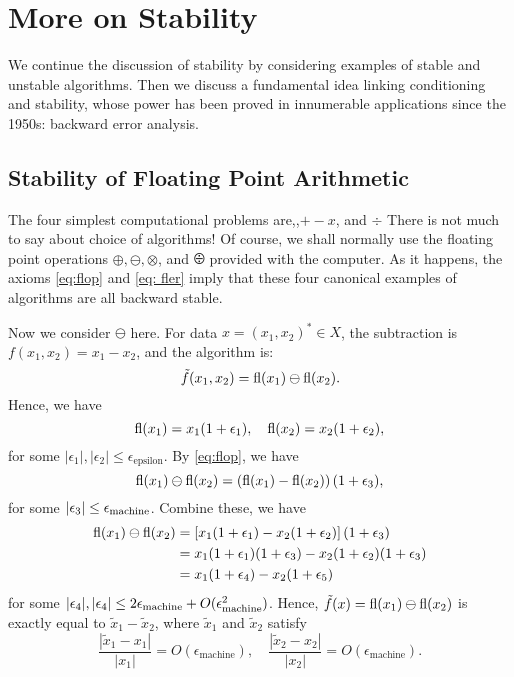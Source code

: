 \chapter{More on Stability}
We continue the discussion of stability by considering examples of stable and unstable algorithms. Then we discuss a fundamental idea linking conditioning and stability, whose power has been proved in innumerable applications since the 1950s: backward error analysis.

\section{Stability of Floating Point Arithmetic}
The four simplest computational problems are,,$+- x$, and $\div$ There is not much to say about choice of algorithms! Of course, we shall normally use the floating point operations $\oplus, \ominus, \otimes$, and $\odiv$ provided with the computer. As it happens, the axioms \eqref{eq:flop} and \eqref{eq: fler} imply that these four canonical examples of algorithms are all backward stable.

Now we consider $\ominus$ here. For data $x=(x_1,x_2)^* \in X$, the subtraction is $f(x_1, x_2) = x_1 - x_2$, and the algorithm is: 
\[
    \tilde f(x_1, x_2) = \operatorname{fl}(x_1) \ominus \operatorname{fl}(x_2). 
\]
Hence, we have 
\[
    \operatorname{fl}(x_1) = x_1(1+\epsilon _1) , \quad \operatorname{fl}(x_2) = x_2 (1+\epsilon _2),
\]
for some $|\epsilon _1| , |\epsilon _2| \le \epsilon_{\text{epsilon}}$. By \autoref{eq:flop}, we have 
\[
    \operatorname{fl}(x_1) \ominus \operatorname{fl}(x_2) = \left( \operatorname{fl}(x_1) -\operatorname{fl}(x_2) \right) (1+\epsilon _3),
\] 
for some $|\epsilon _3| \le \epsilon_{\text{machine}}$. Combine these, we have 
\begin{align*}
    \operatorname{fl}(x_1) \ominus \operatorname{fl}(x_2) &= \left[ x_1 (1+\epsilon _1) -x_2 (1+\epsilon _2) \right] (1+\epsilon _3) \\ 
    & = x_1(1+\epsilon _1)(1+\epsilon _3) -x_2(1+\epsilon _2)(1+\epsilon _3) \\ 
    & = x_1(1+\epsilon _4) - x_2(1+\epsilon _5)
\end{align*}
for some $|\epsilon _4|, |\epsilon _4| \le 2\epsilon_{\text{machine}} + O(\epsilon_{\text{machine}}^2)$.  Hence, $\tilde f(x) = \operatorname{fl}(x_1) \ominus \operatorname{fl}(x_2)$ is exactly equal to $\tilde x_1 - \tilde x_2$, where $\tilde x_1$ and $\tilde x_2$ satisfy 
\[
    \frac{\left|\tilde{x}_1-x_1\right|}{\left|x_1\right|}=O\left(\epsilon_{\text {machine}}\right), \quad \frac{\left|\tilde{x}_2-x_2\right|}{\left|x_2\right|}=O\left(\epsilon_{\text {machine}}\right). 
\]


